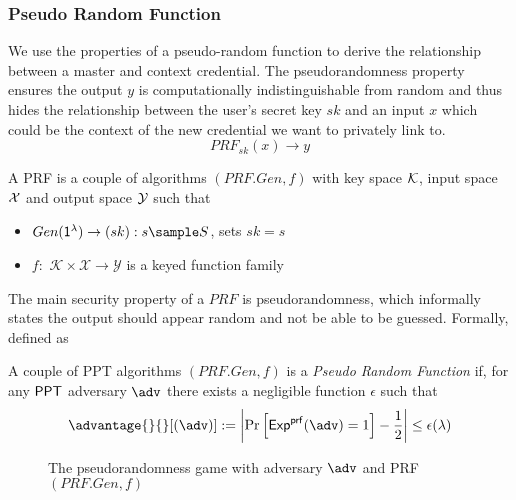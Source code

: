 \subsubsection{Pseudo Random Function}
We use the properties of a pseudo-random function to derive the relationship between a master and context credential. The pseudorandomness property ensures the output $y$ is computationally indistinguishable from random and thus hides the relationship between the user's secret key $sk$ and an input $x$ which could be the context of the new credential we want to privately link to.
\[
    PRF_{sk}(x) \to y
\]

\begin{definition}
    A PRF is a couple of algorithms $(PRF.Gen, f)$ with key space $\mathcal{K}$, input space $\mathcal{X}$ and output space $\mathcal{Y}$ such that 
    \begin{itemize}
        \item $Gen(\secparam) \to (sk): s \sample S$, sets $sk = s$
        \item $f:$ $\mathcal{K} \times \mathcal{X} \to \mathcal{Y}$ is a keyed function family
    \end{itemize}
\end{definition}

The main security property of a $PRF$ is pseudorandomness, which informally states the output should appear random and not be able to be guessed. Formally, defined as

\begin{definition}[Pseudorandomness]
    A couple of PPT algorithms $(PRF.Gen, f)$ is a \textit{Pseudo Random Function} if, for any $\mathsf{PPT}$ adversary $\adv$ there exists a negligible function $\epsilon$ such that 
    \[
    \advantage{}{}[(\adv)] := 
        \left|
    \Pr     \left[ 
                \mathsf{Exp}^{\mathsf{prf}}(\adv) = 1
            \right] - \frac{1}{2}
        \right| \leq \epsilon(\lambda)
    \]
\end{definition}

\begin{figure}
\begin{pchstack}[boxed, center, space=1em]
\end{pchstack}
  \caption{The pseudorandomness game with adversary $\adv$ and PRF $(PRF.Gen, f)$}
  \label{fig:prf}
\end{figure}


